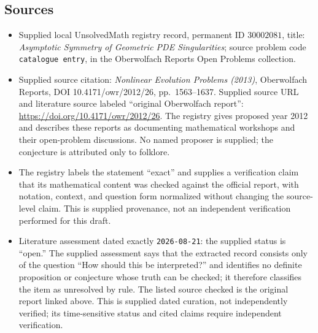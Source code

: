 \documentclass[11pt]{article}
\begin{document}
\subsection{Sources}
\begin{itemize}
\item Supplied local UnsolvedMath registry record, permanent ID \(30002081\), title: \emph{Asymptotic Symmetry of Geometric PDE Singularities}; source problem code \texttt{catalogue entry}, in the Oberwolfach Reports Open Problems collection.
\item Supplied source citation: \emph{Nonlinear Evolution Problems (2013)}, Oberwolfach Reports, DOI 10.4171/owr/2012/26, pp.\ 1563--1637. Supplied source URL and literature source labeled ``original Oberwolfach report'': \url{https://doi.org/10.4171/owr/2012/26}. The registry gives proposed year 2012 and describes these reports as documenting mathematical workshops and their open-problem discussions. No named proposer is supplied; the conjecture is attributed only to folklore.
\item The registry labels the statement ``exact'' and supplies a verification claim that its mathematical content was checked against the official report, with notation, context, and question form normalized without changing the source-level claim. This is supplied provenance, not an independent verification performed for this draft.
\item Literature assessment dated exactly \texttt{2026-08-21}: the supplied status is ``open.'' The supplied assessment says that the extracted record consists only of the question ``How should this be interpreted?'' and identifies no definite proposition or conjecture whose truth can be checked; it therefore classifies the item as unresolved by rule. The listed source checked is the original report linked above. This is supplied dated curation, not independently verified; its time-sensitive status and cited claims require independent verification.
\end{itemize}
\end{document}
